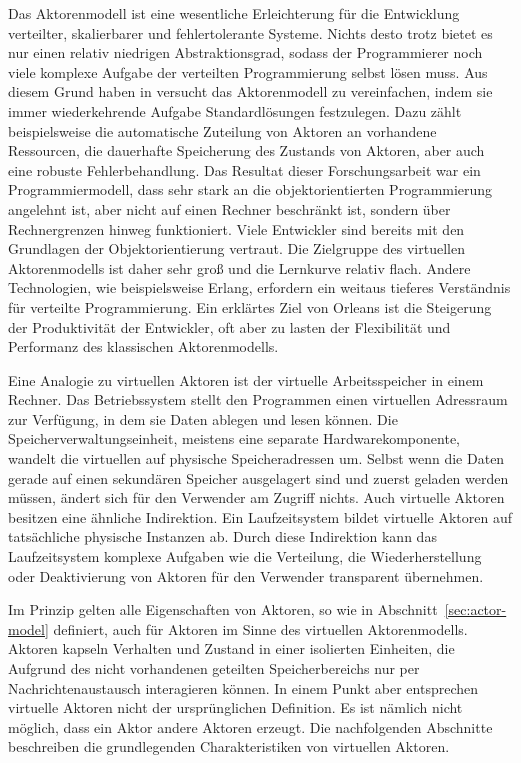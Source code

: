 Das Aktorenmodell ist eine wesentliche Erleichterung für die Entwicklung verteilter, skalierbarer und fehlertolerante Systeme. Nichts desto trotz bietet es nur einen relativ niedrigen Abstraktionsgrad, sodass der Programmierer noch viele komplexe Aufgabe der verteilten Programmierung selbst lösen muss. Aus diesem Grund haben \citeauthor{virtualActors} in \cite{virtualActors} versucht das Aktorenmodell zu vereinfachen, indem sie immer wiederkehrende Aufgabe Standardlösungen festzulegen. Dazu zählt beispielsweise die automatische Zuteilung von Aktoren an vorhandene Ressourcen, die dauerhafte Speicherung des Zustands von Aktoren, aber auch eine robuste Fehlerbehandlung. Das Resultat dieser Forschungsarbeit war ein Programmiermodell, dass sehr stark an die objektorientierten Programmierung angelehnt ist, aber nicht auf einen Rechner beschränkt ist, sondern über Rechnergrenzen hinweg funktioniert. Viele Entwickler sind bereits mit den Grundlagen der Objektorientierung vertraut. Die Zielgruppe des virtuellen Aktorenmodells ist daher sehr groß und die Lernkurve relativ flach. Andere Technologien, wie beispielsweise Erlang, erfordern ein weitaus tieferes Verständnis für verteilte Programmierung. Ein erklärtes Ziel von Orleans ist die Steigerung der Produktivität der Entwickler, oft aber zu lasten der Flexibilität und Performanz des klassischen Aktorenmodells.

Eine Analogie zu virtuellen Aktoren ist der virtuelle Arbeitsspeicher in einem Rechner. Das Betriebssystem stellt den Programmen einen virtuellen Adressraum zur Verfügung, in dem sie Daten ablegen und lesen können. Die Speicherverwaltungseinheit, meistens eine separate Hardwarekomponente, wandelt die virtuellen auf physische Speicheradressen um. Selbst wenn die Daten gerade auf einen sekundären Speicher ausgelagert sind und zuerst geladen werden müssen, ändert sich für den Verwender am Zugriff nichts. Auch virtuelle Aktoren besitzen eine ähnliche Indirektion. Ein Laufzeitsystem bildet virtuelle Aktoren auf tatsächliche physische Instanzen ab. Durch diese Indirektion kann das Laufzeitsystem komplexe Aufgaben wie die Verteilung, die Wiederherstellung oder Deaktivierung von Aktoren für den Verwender transparent übernehmen.

Im Prinzip gelten alle Eigenschaften von Aktoren, so wie in Abschnitt~\ref{sec:actor-model} definiert, auch für Aktoren im Sinne des virtuellen Aktorenmodells. \Dah Aktoren kapseln Verhalten und Zustand in einer isolierten Einheiten, die Aufgrund des nicht vorhandenen geteilten Speicherbereichs nur per Nachrichtenaustausch interagieren können. In einem Punkt aber entsprechen virtuelle Aktoren nicht der ursprünglichen Definition. Es ist nämlich nicht möglich, dass ein Aktor andere Aktoren erzeugt. Die nachfolgenden Abschnitte beschreiben die grundlegenden Charakteristiken von virtuellen Aktoren.

